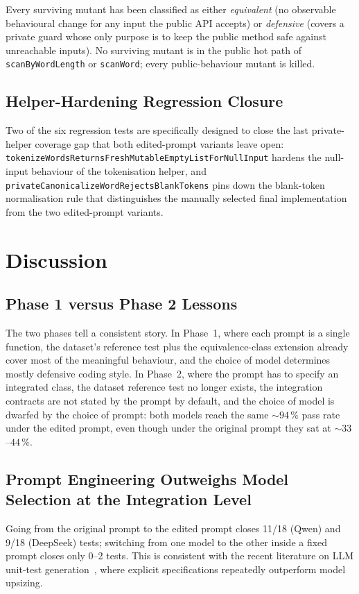 \documentclass[journal]{IEEEtran}
\begin{document}
Every surviving mutant has been classified as either \emph{equivalent}
(no observable behavioural change for any input the public API accepts)
or \emph{defensive} (covers a private guard whose only purpose is to
keep the public method safe against unreachable inputs). No surviving
mutant is in the public hot path of \texttt{scanByWordLength} or
\texttt{scanWord}; every public-behaviour mutant is killed.

\subsection{Helper-Hardening Regression Closure}

Two of the six regression tests are specifically designed to close the
last private-helper coverage gap that both edited-prompt variants leave
open: \texttt{tokenizeWordsReturnsFreshMutableEmptyListForNullInput}
hardens the null-input behaviour of the tokenisation helper, and
\texttt{privateCanonicalizeWordRejectsBlankTokens} pins down the
blank-token normalisation rule that distinguishes the manually selected
final implementation from the two edited-prompt variants.

\section{Discussion}\label{sec:discuss}

\subsection{Phase 1 versus Phase 2 Lessons}
The two phases tell a consistent story. In Phase~1, where each prompt is
a single function, the dataset's reference test plus the
equivalence-class extension already cover most of the meaningful
behaviour, and the choice of model determines mostly defensive coding
style. In Phase~2, where the prompt has to specify an integrated class,
the dataset reference test no longer exists, the integration contracts
are not stated by the prompt by default, and the choice of model is
dwarfed by the choice of prompt: both models reach the same $\sim\!\!94\,\%$
pass rate under the edited prompt, even though under the original prompt
they sat at $\sim\!\!33$--$\!44\,\%$.

\subsection{Prompt Engineering Outweighs Model Selection at the Integration Level}
Going from the original prompt to the edited prompt closes 11/18 (Qwen)
and 9/18 (DeepSeek) tests; switching from one model to the other inside a
fixed prompt closes only 0--2 tests. This is consistent with the recent
literature on LLM unit-test generation~\cite{metatestgen,yang2024,
panta2024,lit_review}, where explicit specifications repeatedly
outperform model upsizing.
\end{document}
